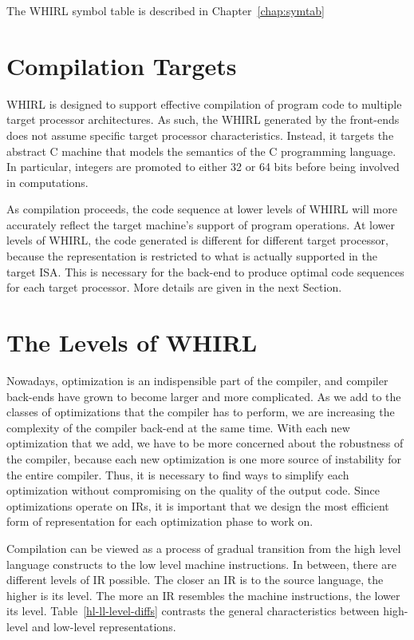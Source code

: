 The WHIRL symbol table is described in Chapter~\ref{chap:symtab}

\section{Compilation Targets}

WHIRL is designed to support effective compilation of program code
to multiple target processor architectures. As such, the WHIRL
generated by the front-ends does not assume specific target processor
characteristics. Instead, it targets the abstract C machine that
models the semantics of the C programming language. In particular,
integers are promoted to either 32 or 64 bits before
being involved in computations. 

As compilation proceeds, the code
sequence at lower levels of WHIRL will more accurately reflect the
target machine's support of program operations. At lower levels of
WHIRL, the code generated is different for different target processor,
because the representation is restricted to what is actually
supported in the target ISA. This is necessary for the back-end to
produce optimal code sequences for each target processor. More
details are given in the next Section.

\section{The Levels of WHIRL}

Nowadays, optimization is an indispensible part of the compiler,
and compiler back-ends have grown to become larger and more complicated.
As we add to the classes of optimizations that the compiler has to
perform, we are increasing the complexity of the compiler back-end
at the same time. With each new optimization that we add, we have
to be more concerned about the robustness of the compiler, because
each new optimization is one more source of instability for the
entire compiler. Thus, it is necessary to find ways to simplify each
optimization without compromising on the quality of the output
code. Since optimizations operate on IRs, it is important that we
design the most efficient form of representation for each optimization
phase to work on. 

Compilation can be viewed as a process of gradual
transition from the high level language constructs to the low level
machine instructions. In between, there are different levels of IR
possible. The closer an IR is to the source language, the higher is
its level. The more an IR resembles the machine instructions, the 
lower its level. 
Table~\ref{hl-ll-level-diffs}
contrasts the general characteristics between high-level 
and low-level representations.

